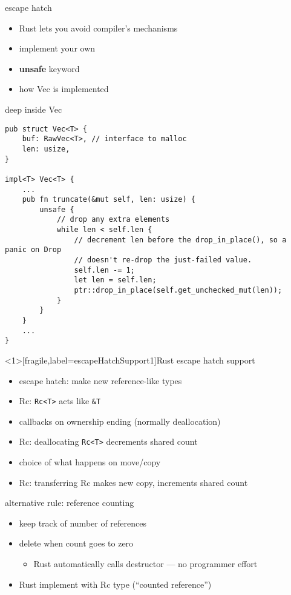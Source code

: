 \begin{frame}{escape hatch}
    \begin{itemize}
    \item Rust lets you avoid compiler's mechanisms
    \item implement your own
    \item \textbf{unsafe} keyword
    \item how Vec is implemented
    \end{itemize}
\end{frame}

\begin{frame}[fragile,label=insideVec]{deep inside Vec}
\begin{verbatim}
pub struct Vec<T> {
    buf: RawVec<T>, // interface to malloc
    len: usize,
}

impl<T> Vec<T> {
    ...
    pub fn truncate(&mut self, len: usize) {
        unsafe {
            // drop any extra elements
            while len < self.len {
                // decrement len before the drop_in_place(), so a panic on Drop
                // doesn't re-drop the just-failed value.
                self.len -= 1;
                let len = self.len;
                ptr::drop_in_place(self.get_unchecked_mut(len));
            }
        }
    }
    ...
}
\end{verbatim}
\end{frame}



\begin{frame}<1>[fragile,label=escapeHatchSupport1]{Rust escape hatch support}
    \begin{itemize}
        \item escape hatch: make new reference-like types
        \item<2> Rc: \verb|Rc<T>| acts like \verb|&T|
        \item callbacks on ownership ending (normally deallocation)
        \item<2> Rc: deallocating \verb|Rc<T>| decrements shared count
        \item choice of what happens on move/copy
        \item<2> Rc: transferring Rc makes new copy, increments shared count
    \end{itemize}
\end{frame}
 
\begin{frame}[fragile,label=refCounting]{alternative rule: reference counting}
    \begin{itemize}
    \item keep track of number of references
    \item delete when count goes to zero
        \begin{itemize}
        \item Rust automatically calls destructor --- no programmer effort
        \end{itemize}
    \item Rust implement with Rc type (``counted reference'')
    \end{itemize}
\end{frame}

